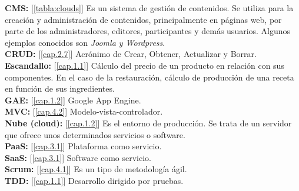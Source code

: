 \setlength{\parindent}{0cm}
{
\textbf{CMS:} [\ref{tabla:clouds}] Es un sistema de gestión de contenidos. Se utiliza para la creación y administración de contenidos, principalmente en páginas web, por parte de los administradores, editores, participantes y demás usuarios. Algunos ejemplos conocidos son \emph{Joomla y Wordpress}.\\

\textbf{CRUD:} [\ref{cap.2.7}] Acrónimo de Crear, Obtener, Actualizar y Borrar. \\

\textbf{Escandallo:} [\ref{cap.1.1}] Cálculo del precio de un producto en relación con sus componentes. En el caso de la restauración, cálculo de producción de una receta en función de sus ingredientes. \\

\textbf{GAE:} [\ref{cap.1.2}] Google App Engine. \\

\textbf{MVC:} [\ref{cap.4.2}] Modelo-vista-controlador. \\

\textbf{Nube (cloud):} [\ref{cap.1.2}] Es el entorno de producción. Se trata de un servidor que ofrece unos determinados servicios o software. \\

\textbf{PaaS:} [\ref{cap.3.1}] Plataforma como servicio.  \\

\textbf{SaaS:} [\ref{cap.3.1}] Software como servicio. \\

\textbf{Scrum:} [\ref{cap.4.1}]  Es un tipo de metodología ágil. \\

\textbf{TDD:} [\ref{cap.1.1}] Desarrollo dirigido por pruebas. \\
}
